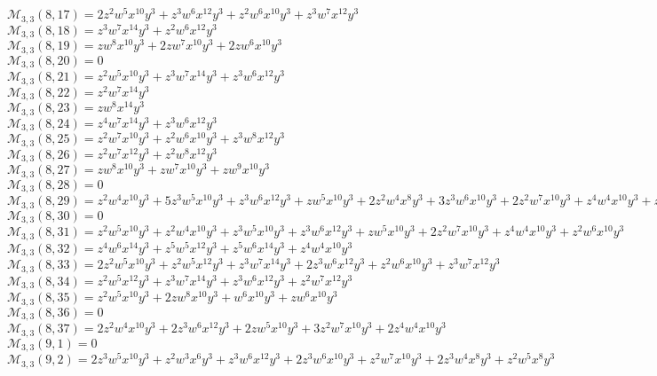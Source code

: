 \documentclass[12pt]{memoireuqam1.3}
\begin{document}
$\mathcal{M}_{3,3}(8,17)=2z^2w^5x^{10}y^3+z^3w^6x^{12}y^3+z^2w^6x^{10}y^3+z^3w^7x^{12}y^3$\\
$\mathcal{M}_{3,3}(8,18)=z^3w^7x^{14}y^3+z^2w^6x^{12}y^3$\\
$\mathcal{M}_{3,3}(8,19)=zw^8x^{10}y^3+2zw^7x^{10}y^3+2zw^6x^{10}y^3$\\
$\mathcal{M}_{3,3}(8,20)=0$\\
$\mathcal{M}_{3,3}(8,21)=z^2w^5x^{10}y^3+z^3w^7x^{14}y^3+z^3w^6x^{12}y^3$\\
$\mathcal{M}_{3,3}(8,22)=z^2w^7x^{14}y^3$\\
$\mathcal{M}_{3,3}(8,23)=zw^8x^{14}y^3$\\
$\mathcal{M}_{3,3}(8,24)=z^4w^7x^{14}y^3+z^3w^6x^{12}y^3$\\
$\mathcal{M}_{3,3}(8,25)=z^2w^7x^{10}y^3+z^2w^6x^{10}y^3+z^3w^8x^{12}y^3$\\
$\mathcal{M}_{3,3}(8,26)=z^2w^7x^{12}y^3+z^2w^8x^{12}y^3$\\
$\mathcal{M}_{3,3}(8,27)=zw^8x^{10}y^3+zw^7x^{10}y^3+zw^9x^{10}y^3$\\
$\mathcal{M}_{3,3}(8,28)=0$\\
$\mathcal{M}_{3,3}(8,29)=z^2w^4x^{10}y^3+5z^3w^5x^{10}y^3+z^3w^6x^{12}y^3+zw^5x^{10}y^3+2z^2w^4x^8y^3+3z^3w^6x^{10}y^3+2z^2w^7x^{10}y^3+z^4w^4x^{10}y^3+z^2w^5x^8y^3$\\
$\mathcal{M}_{3,3}(8,30)=0$\\
$\mathcal{M}_{3,3}(8,31)=z^2w^5x^{10}y^3+z^2w^4x^{10}y^3+z^3w^5x^{10}y^3+z^3w^6x^{12}y^3+zw^5x^{10}y^3+2z^2w^7x^{10}y^3+z^4w^4x^{10}y^3+z^2w^6x^{10}y^3$\\
$\mathcal{M}_{3,3}(8,32)=z^4w^6x^{14}y^3+z^5w^5x^{12}y^3+z^5w^6x^{14}y^3+z^4w^4x^{10}y^3$\\
$\mathcal{M}_{3,3}(8,33)=2z^2w^5x^{10}y^3+z^2w^5x^{12}y^3+z^3w^7x^{14}y^3+2z^3w^6x^{12}y^3+z^2w^6x^{10}y^3+z^3w^7x^{12}y^3$\\
$\mathcal{M}_{3,3}(8,34)=z^2w^5x^{12}y^3+z^3w^7x^{14}y^3+z^3w^6x^{12}y^3+z^2w^7x^{12}y^3$\\
$\mathcal{M}_{3,3}(8,35)=z^2w^5x^{10}y^3+2zw^8x^{10}y^3+w^6x^{10}y^3+zw^6x^{10}y^3$\\
$\mathcal{M}_{3,3}(8,36)=0$\\
$\mathcal{M}_{3,3}(8,37)=2z^2w^4x^{10}y^3+2z^3w^6x^{12}y^3+2zw^5x^{10}y^3+3z^2w^7x^{10}y^3+2z^4w^4x^{10}y^3$\\
$\mathcal{M}_{3,3}(9,1)=0$\\
$\mathcal{M}_{3,3}(9,2)=2z^3w^5x^{10}y^3+z^2w^3x^6y^3+z^3w^6x^{12}y^3+2z^3w^6x^{10}y^3+z^2w^7x^{10}y^3+2z^3w^4x^8y^3+z^2w^5x^8y^3$\\
\end{document}
